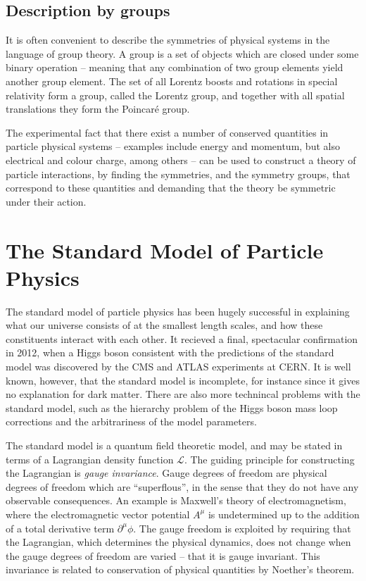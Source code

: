 \documentclass[twoside,english]{uiofysmaster}
\begin{document}
\subsection{Description by groups}
It is often convenient to describe the symmetries of physical systems in the language of group theory. A group is a set of objects which are closed under some binary operation -- meaning that any combination of two group elements yield another group element. The set of all Lorentz boosts and rotations in special relativity form a group, called the Lorentz group, and together with all spatial translations they form the Poincar\'{e} group. 

The experimental fact that there exist a number of conserved quantities in particle physical systems -- examples include energy and momentum, but also electrical and colour charge, among others -- can be used to construct a theory of particle interactions, by finding the symmetries, and the symmetry groups, that correspond to these quantities and demanding that the theory be symmetric under their action.

\section{The Standard Model of Particle Physics}
The standard model of particle physics has been hugely successful in explaining what our universe consists of at the smallest length scales, and how these constituents interact with each other. It recieved a final, spectacular confirmation in 2012, when a Higgs boson consistent with the predictions of the standard model was discovered by the CMS and ATLAS experiments at CERN. It is well known, however, that the standard model is incomplete, for instance since it gives no explanation for dark matter. There are also more technincal problems with the standard model, such as the hierarchy problem of the Higgs boson mass loop corrections and the arbitrariness of the model parameters.

The standard model is a quantum field theoretic model, and may be stated in terms of a Lagrangian density function $\mathcal{L}$. The guiding principle for constructing the Lagrangian is {\it gauge invariance}. Gauge degrees of freedom are physical degrees of freedom which are ``superflous'', in the sense that they do not have any observable consequences. An example is Maxwell's theory of electromagnetism, where the electromagnetic vector potential $A^\mu$ is undetermined up to the addition of a total derivative term $\partial^\mu \phi$. The gauge freedom is exploited by requiring that the Lagrangian, which determines the physical dynamics, does not change when the gauge degrees of freedom are varied -- that it is gauge invariant. This invariance is related to conservation of physical quantities by Noether's theorem.
\end{document}

